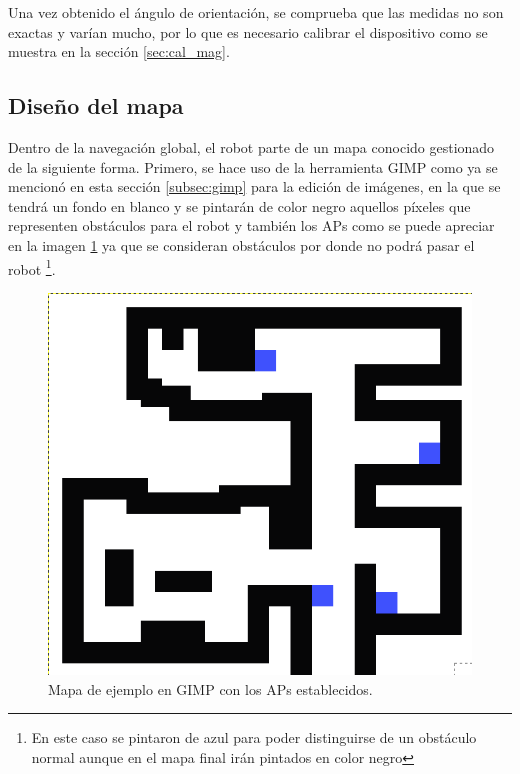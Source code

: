Una vez obtenido el ángulo de orientación, se comprueba que las medidas no son exactas y varían mucho, por lo que es necesario calibrar el dispositivo como se muestra en la sección \ref{sec:cal_mag}.



\subsection{Diseño del mapa}
\label{subsec:diseño_mapa}

Dentro de la navegación global, el robot parte de un mapa conocido gestionado de la siguiente forma. Primero, se hace uso de la herramienta GIMP como ya se mencionó en esta sección \ref{subsec:gimp} para la edición de imágenes, en la que se tendrá un fondo en blanco y se pintarán de color negro aquellos píxeles que representen obstáculos para el robot y también los APs como se puede apreciar en la imagen \ref{fig:mapa_apes} ya que se consideran obstáculos por donde no podrá pasar el robot \footnote{En este caso se pintaron de azul para poder distinguirse de un obstáculo normal aunque en el mapa final irán pintados en color negro}.

\begin{figure}[H]
  \centering
  \includegraphics[scale=0.3]{figs/mapa_apes} %
  \caption{ Mapa de ejemplo en GIMP con los APs establecidos.}
  \label{fig:mapa_apes}
\end{figure}

